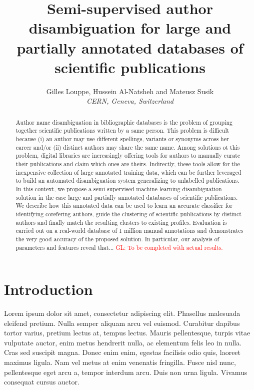 \documentclass[11pt]{article}
\title{Semi-supervised author disambiguation for large and partially annotated databases of scientific publications}
\author{Gilles Louppe, Hussein Al-Natsheh and Mateusz Susik\\
       \it{CERN, Geneva, Switzerland}}
\date{}
\newcommand{\glnote}[1]{\textcolor{red}{GL: #1}}
\begin{document}
\maketitle

\begin{abstract}

Author name disambiguation in bibliographic databases is the problem of
grouping together scientific publications written by a same person. This
problem is difficult because (i) an author may use different spellings,
variants or synonyms across her career and/or (ii) distinct authors may share
the same name. Among solutions ot this problem, digital libraries are
increasingly offering tools for authors to manually curate their publications
and claim which ones are theirs. Indirectly, these tools allow for the
inexpensive collection of large annotated training data, which can be further
leveraged to build an automated disambiguation system generalizing to
unlabelled publications. In this context, we propose a semi-supervised machine
learning disambiguation solution in the case large and partially annotated
databases of scientific publications. We describe how this annotated data can
be used to learn an accurate classifier for identifying corefering authors,
guide the clustering of scientific publications by distinct authors and finally
match the resulting clusters to existing profiles. Evaluation is carried out on
a real-world database of 1 million manual annotations and demonstrates the
very good accuracy of the proposed solution. In particular, our analysis of
parameters and features reveal that... \glnote{To be completed with actual
results.}

\end{abstract}



\section{Introduction}
\label{introduction}


Lorem ipsum dolor sit amet, consectetur adipiscing elit. Phasellus malesuada
eleifend pretium. Nulla semper aliquam arcu vel euismod. Curabitur dapibus
tortor varius, pretium lectus at, tempus lectus. Mauris pellentesque, turpis
vitae vulputate auctor, enim metus hendrerit nulla, ac elementum felis leo in
nulla. Cras sed suscipit magna. Donec enim enim, egestas facilisis odio quis,
laoreet maximus ligula. Nam vel metus at enim venenatis fringilla. Fusce nisl
nunc, pellentesque eget arcu a, tempor interdum arcu. Duis non urna ligula.
Vivamus consequat cursus auctor.
\end{document}
